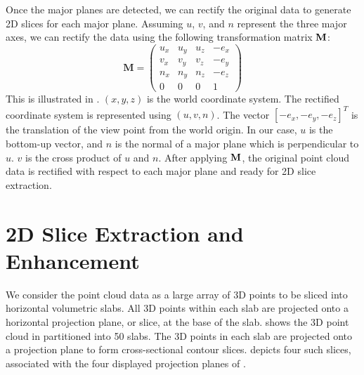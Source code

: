Once the major planes are detected,
we can rectify the original data to generate 2D slices for each major plane.
Assuming $u$, $v$, and $n$ represent the three major axes,
we can rectify the data using the following transformation matrix ${\bf M}$:
\begin{equation*}
\mathbf{M} = \left(
\begin{array}{cccc}
u_x & u_y & u_z & -e_x \\
v_x & v_y & v_z & -e_y \\
n_x & n_y & n_z & -e_z \\
  0 &   0 &   0 &    1
\end{array} \right)
\end{equation*}
This is illustrated in .
$(x, y, z)$ is the world coordinate system.
The rectified coordinate system is represented using $(u, v, n)$.
The vector $[-e_x, -e_y, -e_z]^T$ is the translation
of the view point from the world origin.
In our case, $u$ is the bottom-up vector,
and $n$ is the normal of a major plane
which is perpendicular to $u$.
$v$ is the cross product of $u$ and $n$.
After applying ${\bf M}$,
the original point cloud data is rectified with respect to
each major plane and ready for 2D slice extraction.


\section{2D Slice Extraction and Enhancement}
\label{sec:image_slicing}

We consider the point cloud data as a large array of 3D points to be
sliced into horizontal volumetric slabs.
All 3D points within each slab are projected onto a horizontal projection
plane, or slice, at the base of the slab.
 shows the 3D point cloud in 
partitioned into 50 slabs.
The 3D points in each slab are projected onto a projection plane to
form cross-sectional contour slices.
 depicts four such slices, associated with the four displayed
projection planes of .

